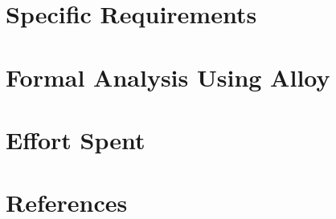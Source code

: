 \documentclass[fontsize=11pt,paper=a4,pagesize=auto]{report}
\begin{document}
\chapter{Specific Requirements}





\chapter{Formal Analysis Using Alloy}



\chapter{Effort Spent}



\chapter{References}

\end{document}
